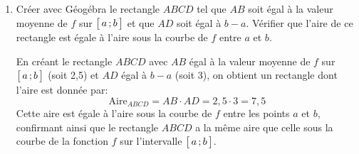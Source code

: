 \documentclass[11pt, a4paper]{report}
\begin{document}
\begin{enumerate}
    \item Créer avec Géogébra le rectangle $ABCD$ tel que $AB$ soit égal à la valeur moyenne de $f$ sur $\bigl[ \, a \, ; b \,\bigl]$ et que $AD$ soit égal à $b-a$. Vérifier que l'aire de ce rectangle est égale à l'aire sous la courbe de $f$ entre $a$ et $b$. 
        \begin{blocvisible}[height=4]
            En créant le rectangle $ABCD$ avec $AB$ égal à la valeur moyenne de $f$ sur $\bigl[ \, a \, ; b \,\bigl]$ (soit 2,5) et $AD$ égal à $b-a$ (soit 3), on obtient un rectangle dont l'aire est donnée par:
            \[\text{Aire}_{ABCD} = AB \cdot AD = 2,5 \cdot 3 = 7,5\]
            Cette aire est égale à l'aire sous la courbe de $f$ entre les points $a$ et $b$, confirmant ainsi que le rectangle $ABCD$ a la même aire que celle sous la courbe de la fonction $f$ sur l'intervalle $\bigl[ \, a \, ; b \,\bigl]$.
        \end{blocvisible}
\end{enumerate}
\end{document}
